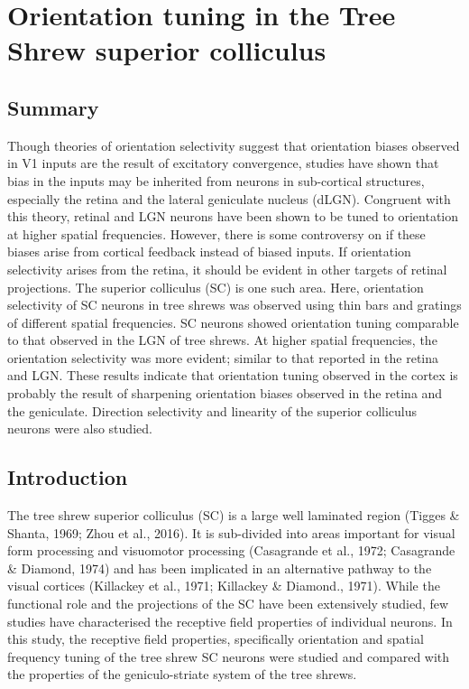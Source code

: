 

	\chapter{Orientation tuning in the Tree Shrew superior colliculus}

	\pagebreak
	\section{Summary}
	
	Though theories of orientation selectivity suggest that orientation biases observed in V1 inputs are the result of excitatory convergence, studies have shown that bias in the inputs may be inherited from neurons in sub-cortical structures, especially the retina and the lateral geniculate nucleus (dLGN). Congruent with this theory, retinal and LGN neurons have been shown to be tuned to orientation at higher spatial frequencies. However, there is some controversy on if these biases arise from cortical feedback instead of biased inputs. If orientation selectivity arises from the retina, it should be evident in other targets of retinal projections. The superior colliculus (SC) is one such area. Here, orientation selectivity of SC neurons in tree shrews was observed using thin bars and gratings of different spatial frequencies. SC neurons showed orientation tuning comparable to that observed in the LGN of tree shrews. At higher spatial frequencies, the orientation selectivity was more evident; similar to that reported in the retina and LGN. These results indicate that orientation tuning observed in the cortex is probably the result of sharpening orientation biases observed in the retina and the geniculate. Direction selectivity and linearity of the superior colliculus neurons were also studied.
	
	\pagebreak
	
	
	\section{Introduction}
	
	The tree shrew superior colliculus (SC) is a large well laminated region (Tigges \& Shanta, 1969; Zhou et al., 2016). It is sub-divided into areas important for visual form processing and visuomotor processing (Casagrande et al., 1972; Casagrande \& Diamond, 1974) and has been implicated in an alternative pathway to the visual cortices (Killackey et al., 1971; Killackey \& Diamond., 1971). While the functional role and the projections of the SC have been extensively studied, few studies have characterised the receptive field properties of individual neurons. In this study, the receptive field properties, specifically orientation and spatial frequency tuning of the tree shrew SC neurons were studied and compared with the properties of the geniculo-striate system of the tree shrews. 
	
